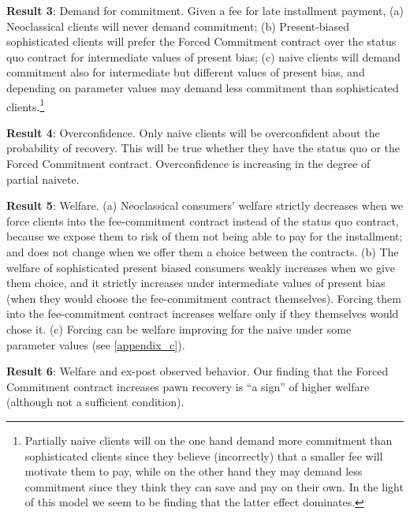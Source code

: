 \documentclass[oneside,11pt]{article}
\begin{document}
\vspace{.1in}
\noindent \textbf{Result 3}: Demand for commitment. Given a fee for late installment payment, (a) Neoclassical clients will never demand commitment; (b) Present-biased sophisticated clients will prefer the Forced Commitment contract over the status quo contract for intermediate values of present bias; (c) naive clients will demand commitment also for intermediate but different values of present bias, and depending on parameter values may demand less commitment than sophisticated clients.\footnote{Partially naive clients will on the one hand demand more commitment than sophisticated clients since they believe (incorrectly) that a smaller fee will motivate them to pay, while on the other hand they may demand less commitment since they think they can save and pay on their own. In the light of this model we seem to be finding that the latter effect dominates. %
}

\vspace{.1in}
\noindent \textbf{Result 4}: Overconfidence. Only naive clients will be overconfident about the probability of recovery. This will be true whether they have the status quo or the Forced Commitment contract. Overconfidence is increasing in the degree of partial naivete.

\vspace{.1in}
\noindent \textbf{Result 5}: Welfare. (a) Neoclassical consumers' welfare strictly decreases when we force clients into the fee-commitment contract instead of the status quo contract, because we expose them to risk of them not being able to pay for the installment; and does not change when we offer them a choice between the contracts. (b) The welfare of sophisticated present biased consumers weakly increases when we give them choice, and it strictly increases  under intermediate values of present bias (when they would choose the fee-commitment contract themselves). Forcing them into the fee-commitment contract increases welfare only if they themselves would chose it. (c) Forcing can be welfare improving for the naive under some parameter values (see \ref{appendix_c}). 

\vspace{.1in}
\noindent \textbf{Result 6}: Welfare and ex-post observed behavior. Our finding that the Forced Commitment contract increases pawn recovery is ``a sign'' of higher welfare (although not a sufficient condition).
\end{document}
